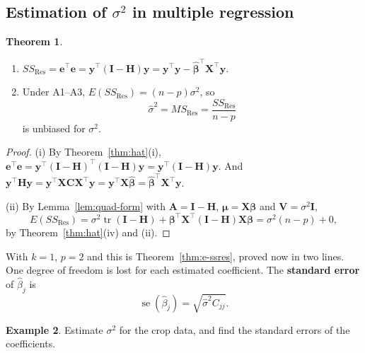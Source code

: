 \documentclass[11pt,a4paper]{article}
\numberwithin{equation}{section}
\theoremstyle{definition}
\newtheorem{thm}{Theorem}[subsection]
\newtheorem{exa}[thm]{Example}
\begin{document}
\subsection{Estimation of $\sigma^2$ in multiple regression}
\begin{thm}\label{thm:ssres-matrix}
\begin{enumerate}[label=(\roman*)]
\item $SS_{\mathrm{Res}} = \mathbf{e}^\top\mathbf{e} = \mathbf{y}^\top(\mathbf{I} - \mathbf{H})\mathbf{y}
= \mathbf{y}^\top\mathbf{y} - \hat{\boldsymbol\beta}^\top\mathbf{X}^\top\mathbf{y}$.
\item Under A1--A3, $E(SS_{\mathrm{Res}}) = (n - p)\sigma^2$, so
\[
\hat\sigma^2 = MS_{\mathrm{Res}} = \frac{SS_{\mathrm{Res}}}{n - p}
\]
is unbiased for $\sigma^2$.
\end{enumerate}
\end{thm}

\begin{proof}
(i) By Theorem~\ref{thm:hat}(i),
$\mathbf{e}^\top\mathbf{e} = \mathbf{y}^\top(\mathbf{I} - \mathbf{H})^\top(\mathbf{I} - \mathbf{H})\mathbf{y} = \mathbf{y}^\top(\mathbf{I} - \mathbf{H})\mathbf{y}$.
And $\mathbf{y}^\top\mathbf{H}\mathbf{y} = \mathbf{y}^\top\mathbf{X}\mathbf{C}\mathbf{X}^\top\mathbf{y} = \mathbf{y}^\top\mathbf{X}\hat{\boldsymbol\beta} = \hat{\boldsymbol\beta}^\top\mathbf{X}^\top\mathbf{y}$.

(ii) By Lemma~\ref{lem:quad-form} with $\mathbf{A} = \mathbf{I} - \mathbf{H}$,
$\boldsymbol\mu = \mathbf{X}\boldsymbol\beta$ and $\mathbf{V} = \sigma^2\mathbf{I}$,
\[
E(SS_{\mathrm{Res}}) = \sigma^2\operatorname{tr}(\mathbf{I} - \mathbf{H})
  + \boldsymbol\beta^\top\mathbf{X}^\top(\mathbf{I} - \mathbf{H})\mathbf{X}\boldsymbol\beta
= \sigma^2(n - p) + 0 ,
\]
by Theorem~\ref{thm:hat}(iv) and (ii).
\end{proof}

With $k = 1$, $p = 2$ and this is Theorem~\ref{thm:e-ssres}, proved now in two lines. One
degree of freedom is lost for each estimated coefficient. The \textbf{standard error} of
$\hat\beta_j$ is
\[
\operatorname{se}(\hat\beta_j) = \sqrt{\hat\sigma^2 C_{jj}} .
\]

\begin{exa}\label{exa:crop-sigma}
Estimate $\sigma^2$ for the crop data, and find the standard errors of the coefficients.
\end{exa}
\end{document}
